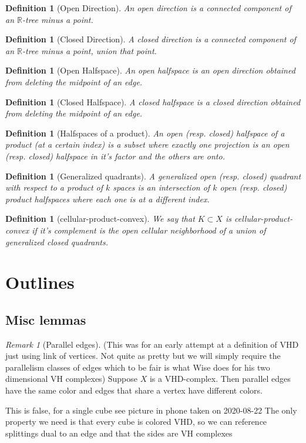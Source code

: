 \documentclass{article}
\theoremstyle{mystyle}
\newtheorem{defn}[thm]{Definition}
\theoremstyle{remark}
\newtheorem{rmk}{Remark}[section]
\begin{document}
\begin{defn}[Open Direction] An open direction is a connected component of an \(\mathbb{R}\)-tree minus a point. 
\end{defn}

\begin{defn}[Closed Direction] A closed direction is a connected component of an \(\mathbb{R}\)-tree minus a point, union that point.
\end{defn}
\begin{defn}[Open Halfspace] An open halfspace is an open direction obtained from deleting the midpoint of an edge.
\end{defn}
\begin{defn}[Closed Halfspace] A closed halfspace is a closed direction obtained from deleting the midpoint of an edge.
\end{defn}
\begin{defn}[Halfspaces of a product] An open (resp. closed) halfspace of a product (at a certain index) is a subset where exactly one projection is an open (resp. closed)  halfspace in it's factor and the others are onto.
\end{defn}
\begin{defn}[Generalized quadrants] A generalized open (resp. closed) quadrant with respect to a product of \(k\) spaces is an intersection of \(k\) open (resp. closed) product halfspaces where each one is at a different index.
\end{defn}
\begin{defn}[cellular-product-convex] We say that \(K \subset X\) is cellular-product-convex if it's complement is the open cellular neighborhood of a union of generalized closed quadrants.
\end{defn}



\section{Outlines}

\subsection{Misc lemmas}

\begin{rmk}
    [Parallel edges]
    (This was for an early attempt at a definition of VHD just using link of vertices. Not quite as pretty but we will simply require the parallelism classes of edges which to be fair is what Wise does for his two dimensional VH complexes)
    Suppose \(X\) is a VHD-complex. Then parallel edges have the same color and edges that share a vertex have different colors.

    This is false, for a single cube see picture in phone taken on 2020-08-22
    The only property we need is that every cube is colored VHD, so we can reference splittings dual to an edge and that the sides are VH complexes
\end{rmk}
\end{document}
